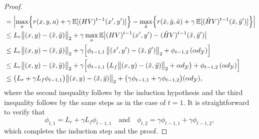 \documentclass[10pt,a4paper]{amsart}
\newcommand{\E}{\mathbb{E}}
\begin{document}
\begin{proof}
\begin{align*}
    &= \Bigl| \max_{a} \Bigl \{ r(x,y, a) + \gamma \, \E [ (HV)^{t-1} (x',y')] \Bigr \} - \max_{\tilde{a}} \Bigl \{ r(\tilde{x},\tilde{y},\tilde{a}) + \gamma \, \E [ (\tilde{H}V)^{t-1} (\tilde{x}, \tilde{y}')]\Bigr \} \Bigr| \nonumber\\
    &\le  L_r \bigl \|(x, y) - (\tilde{x}, \tilde{y}) \bigr\|_2 + \gamma \max_{a}  \mathbb{E} \bigl | (HV)^{t-1}(x', y') - (\tilde{H}V)^{t-1}(\tilde{x}, \tilde{y}')  \bigr|\\
    &\le  L_r \bigl \|(x, y) - (\tilde{x}, \tilde{y}) \bigr\|_2 + \gamma 
    \Bigl[ \phi_{t-1, 1} \, \bigl\|(x',y')-(\tilde{x}, \tilde{y}') \bigr \|_2 + \phi_{t-1, 2} \, (\alpha d_\mathcal{Y}) \Bigr]\\
    &\le  L_r \bigl \|(x, y) - (\tilde{x}, \tilde{y}) \bigr\|_2 + \gamma 
    \Bigl[ \phi_{t-1, 1} \, \bigl(L_f \bigl \| (x, y) - (\tilde{x}, \tilde{y}) \bigr\|_2 + \alpha d_\mathcal{Y}  \bigr) + \phi_{t-1, 2} \, (\alpha d_\mathcal{Y}) \Bigr]\\
    &\le \bigl(L_r + \gamma L_f \phi_{t-1, 1} \bigr) \bigl \|(x, y) - (\tilde{x}, \tilde{y}) \bigr\|_2 +  \bigl(\gamma\phi_{t-1, 1} + \gamma \phi_{t-1, 2}\bigr)(\alpha d_\mathcal{Y}),
\end{align*}
where the second inequality follows by the induction hypothesis and the third inequality follows by the same steps as in the case of $t=1$. It is straightforward to verify that
\[
\phi_{t, 1} = L_r + \gamma L_f \phi_{t-1, 1} \quad \text{and} \quad \phi_{t, 2} = \gamma\phi_{t-1, 1} + \gamma \phi_{t-1, 2},
\]
which completes the induction step and the proof.
\end{proof}
\end{document}
